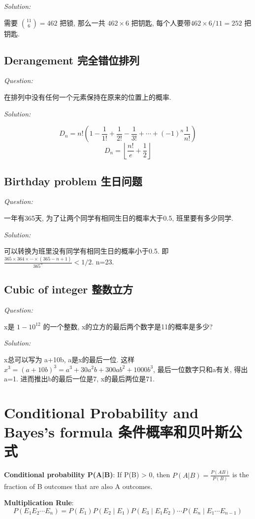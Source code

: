 \documentclass[12pt]{book}
\begin{document}
 \noindent \textit{Solution:} 
 
 需要 $\binom{11}{6}=462$ 把锁, 那么一共 $462\times 6$ 把钥匙, 每个人要带$462\times 6/11=252$ 把钥匙.

  \subsection{Derangement 完全错位排列}
\noindent \textit{Question:}

在排列中没有任何一个元素保持在原来的位置上的概率.

 \noindent \textit{Solution:} 
 
 $$D_n=n!\left(1-\frac{1}{1!}+\frac{1}{2!}-\frac{1}{3!}+\cdots+(-1)^n\frac{1}{n!}\right)$$ 
 $$D_n=\left\lfloor\frac{n!}{e}+\frac{1}{2}\right\rfloor$$

  \subsection{Birthday problem 生日问题}
\noindent \textit{Question:}

一年有365天, 为了让两个同学有相同生日的概率大于0.5, 班里要有多少同学.

 \noindent \textit{Solution:} 
 
 可以转换为班里没有同学有相同生日的概率小于0.5. 即 $\frac{365\times364\times\cdots\times(365-n+1)}{365^n}<1/2$. n=23.
 
   \subsection{Cubic of integer 整数立方}
\noindent \textit{Question:}

x是 $1-10^{12}$ 的一个整数, x的立方的最后两个数字是11的概率是多少?

 \noindent \textit{Solution:} 
 
 x总可以写为 a+10b, a是x的最后一位. 这样 $x^3=(a+10b)^3=a^3+30a^2b+300ab^2+1000b^3$, 最后一位数字只和a有关, 得出a=1. 进而推出b的最后一位是7, x的最后两位是71. 
 
 \section{Conditional Probability and Bayes's formula 条件概率和贝叶斯公式}

\textbf{Conditional probability P(A|B)}: If P(B) > 0, then $P(A|B) = \frac{P(AB)}{P(B)}$
is the fraction
of B outcomes that are also A outcomes.

\textbf{Multiplication Rule}: $$P(E_1E_2\cdots E_n)=P(E_1)P(E_2\mid E_1)P(E_3\mid E_1E_2)\cdots P(E_n\mid E_1\cdots E_{n-1})$$
\end{document}
